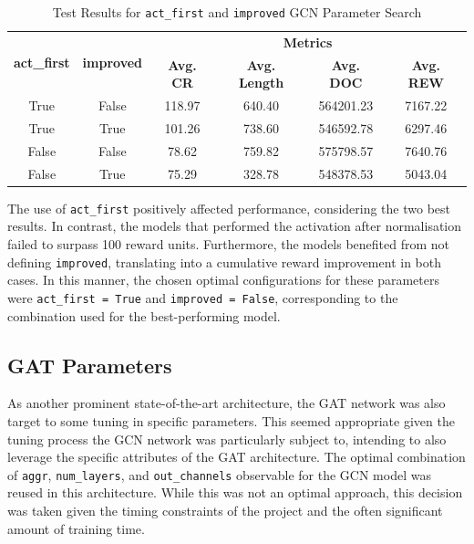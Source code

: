   \begin{table}[h!]
 	\centering
 	\caption{Test Results for \texttt{act\_first} and \texttt{improved} \ac{GCN} Parameter Search}
 	\begin{tabular}{cccccc}
 		\toprule
 		\multirow{2}{*}{\textbf{act\_first}} & \multirow{2}{*}{\textbf{improved}} & \multicolumn{4}{c}{\textbf{Metrics}} \\ 
 		\cmidrule(lr){3-6}
 		&  &  \textbf{Avg. CR} & \textbf{Avg. Length} & \textbf{Avg. DOC} & \textbf{Avg. REW} \\ 
 		\midrule
 		True & False & 118.97 & 640.40 & 564201.23 & 7167.22 \\
 		True & True & 101.26 & 738.60 & 546592.78 & 6297.46 \\
 		False & False & 78.62 & 759.82 & 575798.57& 7640.76 \\
 		False & True & 75.29 & 328.78 & 548378.53 & 5043.04 \\
 		\bottomrule
 	\end{tabular}
 	\label{tab:test-gcn-params}
 \end{table}
 
 
 The use of \texttt{act\_first} positively affected performance, considering the two best results. In contrast, the models that performed the activation after normalisation failed to surpass 100 reward units. Furthermore, the models benefited from not defining \texttt{improved}, translating into a cumulative reward improvement in both cases. In this manner, the chosen optimal configurations for these parameters were \texttt{act\_first = True} and \texttt{improved = False}, corresponding to the combination used for the best-performing model.
 
\subsection{\ac{GAT} Parameters} \label{sec:results-gat-param}
 
As another prominent state-of-the-art architecture, the \ac{GAT} network was also target to some tuning in specific parameters. This seemed appropriate given the tuning process the \ac{GCN} network was particularly subject to, intending to also leverage the specific attributes of the \ac{GAT} architecture. The optimal combination of \texttt{aggr}, \texttt{num\_layers}, and \texttt{out\_channels} observable for the \ac{GCN} model was reused in this architecture. While this was not an optimal approach, this decision was taken given the timing constraints of the project and the often significant amount of training time. \par

